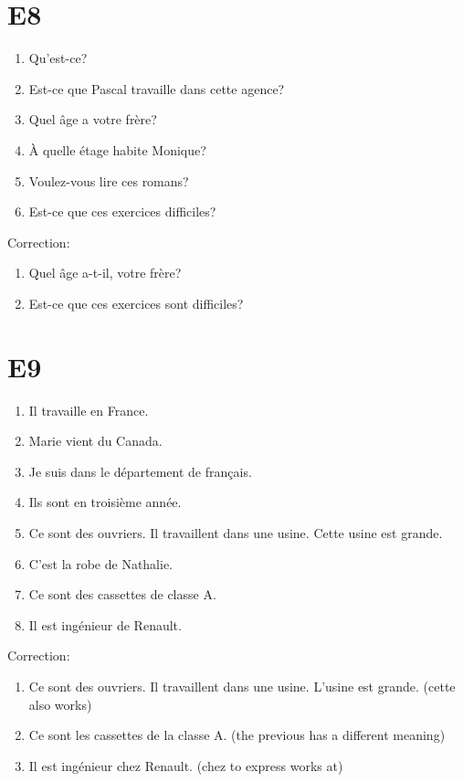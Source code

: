 \documentclass{book}
\begin{document}
    \section{E8}
        \begin{enumerate}
            \item Qu'est-ce?
            \item Est-ce que Pascal travaille dans cette agence?
            \item Quel âge a votre frère?
            \item À quelle étage habite Monique?
            \item Voulez-vous lire ces romans?
            \item Est-ce que ces exercices difficiles?
        \end{enumerate}
        Correction:
        \begin{enumerate}
            \item Quel âge a-t-il, votre frère?
            \item Est-ce que ces exercices sont difficiles?
        \end{enumerate}

    \section{E9}
        \begin{enumerate}
            \item Il travaille en France.
            \item Marie vient du Canada.
            \item Je suis dans le département de français.
            \item Ils sont en troisième année.
            \item Ce sont des ouvriers. Il travaillent dans une usine. Cette usine est grande.
            \item C'est la robe de Nathalie.
            \item Ce sont des cassettes de classe A.
            \item Il est ingénieur de Renault.
        \end{enumerate}
        Correction:
        \begin{enumerate}
            \item Ce sont des ouvriers. Il travaillent dans une usine. L'usine est grande. (cette also works)
            \item Ce sont les cassettes de la classe A. (the previous has a different meaning)
            \item Il est ingénieur chez Renault. (chez to express works at)
        \end{enumerate}
\end{document}
